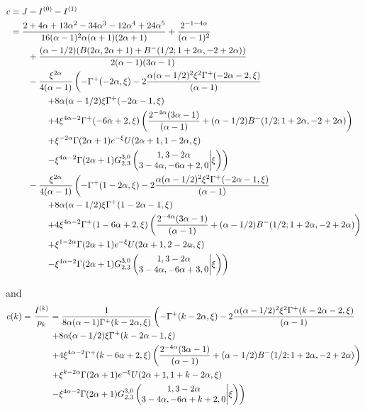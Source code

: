 \begin{align*}
c &= J-I^{(0)}-I^{(1)} \\
&=\frac{2 + 4 \alpha + 13 \alpha^2 - 34 \alpha^3 - 12\alpha^4 + 
	24 \alpha^5}{16(\alpha-1)^2 \alpha (\alpha+1) (2\alpha+1)} +  \frac{2^{-1 - 
		4 \alpha}}{(\alpha - 1)^2} \\
	&\qquad+ \frac{(\alpha - 1/2) (B(2 \alpha, 2 \alpha + 1) + 
	B^-(1/2; 1 + 2 \alpha, -2 + 2 \alpha))}{2 (\alpha - 1) (3 \alpha - 1)} \\
	&\qquad-\frac{\xi^{2\alpha}}{4(\alpha-1)} \left( -\Gamma^+( - 2 \alpha, \xi) - 2\frac{\alpha (\alpha - 1/2)^2 \xi^{2} \Gamma^+(- 2 \alpha - 2, \xi)}{(\alpha - 1)} \right. \\ 
&\qquad\qquad\left.+ 8 \alpha (\alpha - 1/2) \xi \Gamma^+( - 2 \alpha - 1,\xi) \right.\\ 
&\qquad\qquad\left.+ 4\xi^{4\alpha - 2} \Gamma^+( - 6 \alpha + 2, 
      \xi) \left( \frac{2^{ - 4\alpha}(3 \alpha - 1)}{(\alpha - 1)} + (\alpha - 1/2) B^-(1/2; 1 + 2 \alpha, -2 + 2 \alpha) \right)  \right.\\ 
&\qquad\qquad\left.+ \xi^{-2\alpha} \Gamma(2\alpha+1)e^{-\xi} U(2\alpha+1,1-2\alpha,\xi) \right. \\ 
&\qquad\qquad\left.- \xi^{4\alpha-2} \Gamma(2\alpha+1)\MeijerG{3}{0}{2}{3}{1,3-2\alpha}{3-4\alpha,-6\alpha+2,0}{\xi}  \right) \\
&\qquad-\frac{\xi^{2\alpha}}{4(\alpha-1)} \left( -\Gamma^+(1 - 2 \alpha, \xi) - 2\frac{\alpha (\alpha - 1/2)^2 \xi^{2} \Gamma^+( - 2 \alpha - 1, \xi)}{(\alpha - 1)} \right. \\ 
&\qquad\qquad\left.+ 8 \alpha (\alpha - 1/2) \xi \Gamma^+(1 - 2 \alpha - 1,\xi) \right.\\ 
&\qquad\qquad\left.+ 4\xi^{4\alpha - 2} \Gamma^+(1 - 6 \alpha + 2, 
      \xi) \left( \frac{2^{ - 4\alpha}(3 \alpha - 1)}{(\alpha - 1)} + (\alpha - 1/2) B^-(1/2; 1 + 2 \alpha, -2 + 2 \alpha) \right)  \right.\\ 
&\qquad\qquad\left.+ \xi^{1-2\alpha} \Gamma(2\alpha+1)e^{-\xi} U(2\alpha+1,2-2\alpha,\xi) \right. \\ 
&\qquad\qquad\left.- \xi^{4\alpha-2} \Gamma(2\alpha+1)\MeijerG{3}{0}{2}{3}{1,3-2\alpha}{3-4\alpha,-6\alpha+3,0}{\xi}  \right)
\end{align*}

and 
\begin{align*}
c(k) = \frac{I^{(k)}}{p_k} &=\frac{1}{8\alpha (\alpha-1)\Gamma^+(k-2\alpha,\xi)} \left( -\Gamma^+(k - 2 \alpha, \xi) - 2\frac{\alpha (\alpha - 1/2)^2 \xi^{2} \Gamma^+(k - 2 \alpha - 2, \xi)}{(\alpha - 1)} \right. \\ 
&\left.+ 8 \alpha (\alpha - 1/2) \xi \Gamma^+(k - 2 \alpha - 1,\xi) \right.\\ 
&\left.+ 4\xi^{4\alpha - 2} \Gamma^+(k - 6 \alpha + 2, 
      \xi) \left( \frac{2^{ - 4\alpha}(3 \alpha - 1)}{(\alpha - 1)} + (\alpha - 1/2) B^-(1/2; 1 + 2 \alpha, -2 + 2 \alpha) \right)  \right.\\ 
&\left.+ \xi^{k-2\alpha} \Gamma(2\alpha+1)e^{-\xi} U(2\alpha+1,1+k-2\alpha,\xi) \right. \\ 
&\left.- \xi^{4\alpha-2} \Gamma(2\alpha+1)\MeijerG{3}{0}{2}{3}{1,3-2\alpha}{3-4\alpha,-6\alpha+k+2,0}{\xi}  \right)
\end{align*}

